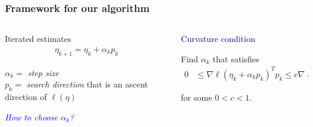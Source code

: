 \documentclass[ 10pt]{beamer}
\begin{document}
\frame
{
  \frametitle{Framework for our algorithm}
\begin{columns}[]
\begin{column}[t]{0.35\textwidth}
{
Iterated estimates
\begin{align*}
	\eta_{k+1} = \eta_k + \alpha_k p_k
\end{align*}

$\alpha_k =$ \emph{step size}\\
$p_k = $ \emph{search direction} that
is an ascent direction of $\ell(\eta)$
\vspace{10mm}

\textcolor{blue}{\emph{How to choose $\alpha_k$?}}
}
\end{column}

\begin{column}[T]{0.65\textwidth}
{
\pause

\textcolor{darkblue}{Curvature condition}
\vspace{1mm}

Find $\alpha_k$ that satisfies
\begin{align*}
	 0 & \leq \nabla \ell( \eta_k + \alpha_k p_k)^T p_k \leq c \nabla \ell(\eta_k)^T 
p_k
\end{align*}
}
for some $0 < c < 1$.
\vspace{2mm}

    \scalebox{.26}{}
\end{column}
\end{columns}
}

\end{document}
